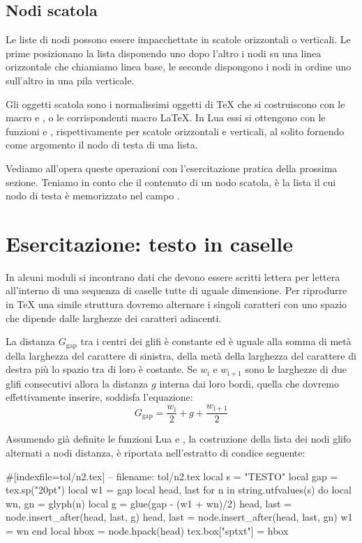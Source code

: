 \subsection{Nodi scatola}

Le liste di nodi possono essere impacchettate in scatole orizzontali o
verticali. Le prime posizionano la lista disponendo uno dopo l'altro i nodi su
una linea orizzontale che chiamiamo linea base, le seconde dispongono i nodi in
ordine uno sull'altro in una pila verticale.

Gli oggetti scatola sono i normalissimi oggetti di \TeX{} che si costruiscono
con le macro  e , o le corrispondenti macro \LaTeX. In Lua
essi si ottengono con le funzioni  e
, rispettivamente per scatole orizzontali e
verticali, al solito fornendo come argomento il nodo di testa di una lista.

Vediamo all'opera queste operazioni con l'esercitazione pratica della prossima
sezione. Teniamo in conto che il contenuto di un nodo scatola, è la lista il cui
nodo di testa è memorizzato nel campo .


\section{Esercitazione: testo in caselle}

In alcuni moduli si incontrano dati che devono essere scritti lettera per
lettera all'interno di una sequenza di caselle tutte di uguale dimensione. Per
riprodurre in \TeX{} una simile struttura dovremo alternare i singoli caratteri
con uno spazio che dipende dalle larghezze dei caratteri adiacenti.

La distanza \( G_\mathrm{gap} \) tra i centri dei glifi è constante ed è uguale
alla somma di metà della larghezza del carattere di sinistra, della metà della
larghezza del carattere di destra più lo spazio tra di loro è costante. Se
\(w_\mathrm{i} \) e \(w_\mathrm{i+1} \) sono le larghezze di due glifi
consecutivi allora la distanza \( g \) interna dai loro bordi, quella che
dovremo effettivamente inserire, soddisfa l'equazione:
\[
    G_\mathrm{gap} = \frac{w_\mathrm{i}}{2} + g + \frac{w_\mathrm{i+1}}{2}
\]

Assumendo già definite le funzioni Lua  e , la costruzione
della lista dei nodi glifo alternati a nodi distanza, è riportata nell'estratto
di condice seguente:
\begin{lines}
#[indexfile=tol/n2.tex]
-- filename: tol/n2.tex
local s = "TESTO"
local gap = tex.sp("20pt")
local w1 = gap
local head, last
for n in string.utfvalues(s) do
    local wn, gn = glyph(n)
    local g = glue(gap - (w1 + wn)/2)
    head, last = node.insert_after(head, last, g)
    head, last = node.insert_after(head, last, gn)
    w1 = wn
end
local hbox = node.hpack(head)
tex.box["sptxt"] = hbox
\end{lines}

